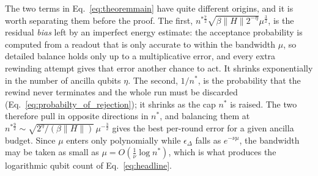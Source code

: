 \documentclass[aps,floatfix,10pt,amssymb,amsfont,amsmath,superscriptaddress,float,nofootinbib,longbibliography,nobalancelastpage,twocolumn]{revtex4-2}
\begin{document}
The two terms in Eq.~\eqref{eq:theoremmain} have quite different origins, and it is worth separating them before the proof. The first, $n^{*\frac{7}{2}}\sqrt{\beta\|H\|2^{-\eta}}\mu^{\frac{3}{2}}$, is the residual \emph{bias} left by an imperfect energy estimate: the acceptance probability is computed from a readout that is only accurate to within the bandwidth $\mu$, so detailed balance holds only up to a multiplicative error, and every extra rewinding attempt gives that error another chance to act. It shrinks exponentially in the number of ancilla qubits $\eta$. The second, $1/n^*$, is the probability that the rewind never terminates and the whole run must be discarded (Eq.~\eqref{eq:probabilty_of_rejection}); it shrinks as the cap $n^*$ is raised. The two therefore pull in opposite directions in $n^*$, and balancing them at $n^{*\frac{9}{2}} \sim \sqrt{2^{\eta}/(\beta\|H\|)}\,\mu^{-\frac32}$ gives the best per-round error for a given ancilla budget. Since $\mu$ enters only polynomially while $\epsilon_{\Delta}$ falls as $e^{-\nu\mu}$, the bandwidth may be taken as small as $\mu = O(\frac{1}{\nu}\log n^*)$, which is what produces the logarithmic qubit count of Eq.~\eqref{eq:headline}.
\end{document}
